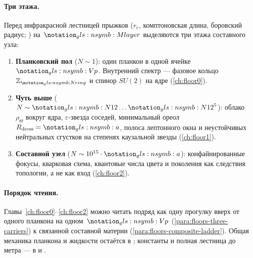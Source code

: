 \paragraph{Три этажа.}
Перед инфракрасной лестницей прыжков ($r_e$, комптоновская длина, боровский радиус;
) на~$\Mlayer$ выделяются три этажа составного узла:

\begin{enumerate}[label=\textbf{этаж~\arabic*.},leftmargin=*]
\item \textbf{Планковский пол} ($N\sim 1$): один планкон в одной ячейке~$\hv$.
  Внутренний спектр --- фазовое кольцо $\mathbb{Z}_{\phaseRingCount}$ и спинор $SU(2)$ на ядре
  (\cref{ch:floor0}).

\item \textbf{Чуть выше} ($N\sim \geomNeighborTwelve\ldots \geomNeighborTwelve^{5}$): облако~$\rho_\Theta$
  вокруг ядра, $\varepsilon$-звезда соседей, минимальный ореол $R_{\mathrm{dress}}=\caStepSpace$,
  полоса лептонного окна и неустойчивых нейтральных сгустков на степенях каузальной звезды
  (\cref{ch:floor1}).

\item \textbf{Составной узел} ($N\sim 10^{15}\cdot\caStepSpace$): конфайнированные фокусы,
  кварковая схема, квантовые числа цвета и поколения как следствия топологии,
  а не как вход (\cref{ch:floor2}).
\end{enumerate}

\paragraph{Порядок чтения.}
Главы~\ref{ch:floor0}--\ref{ch:floor2} можно читать подряд как одну прогулку вверх
от одного планкона на одном~$\hv$ (\cref{para:floors-three-carriers})
к связанной составной материи (\cref{para:floors-composite-ladder}).
Общая механика планкона и жидкости остаётся в ;
константы и полная лестница до метра --- в  и .

